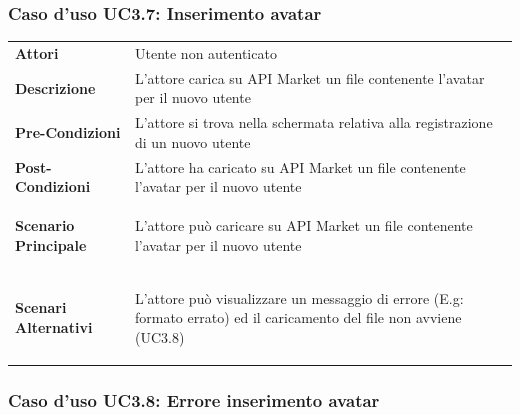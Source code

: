\subsubsection{Caso d'uso UC3.7: Inserimento avatar}
\label{UC3_7}

\begin{minipage}{\linewidth}
	\begin{tabular}{ l | p{11cm}}
		\hline
		\rowcolor{Gray}
		\multicolumn{2}{c}{UC3.7 - Inserimento avatar} \\
		\hline
		\textbf{Attori} & Utente non autenticato \\
		\textbf{Descrizione} & L'attore carica su API Market un file contenente l'avatar per il nuovo utente \\
		\textbf{Pre-Condizioni} & L'attore si trova nella schermata relativa alla registrazione di un nuovo utente \\
		\textbf{Post-Condizioni} & L'attore ha caricato su API Market un file contenente l'avatar per il nuovo utente \\
		\textbf{Scenario Principale} & 
		\begin{enumerate*}[label=(\arabic*.),itemjoin={\newline}]
			\item L'attore può caricare su API Market un file contenente l'avatar per il nuovo utente
		\end{enumerate*}\\
		\textbf{Scenari Alternativi} & 
		\begin{enumerate*}[label=(\arabic*.),itemjoin={\newline}]
		\item L'attore può visualizzare un messaggio di errore (E.g: formato errato) ed il caricamento del file non avviene (UC3.8)
		\end{enumerate*}\\
	\end{tabular}
\end{minipage}

\subsubsection{Caso d'uso UC3.8: Errore inserimento avatar}
\label{UC3_8}

